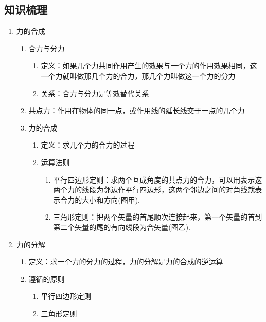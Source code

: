 \documentclass[cn,11pt]{elegantbook}
\begin{document}
      \subsection{知识梳理}
      \begin{enumerate}
         \item 力的合成
         \begin{enumerate}
            \item 合力与分力
            \begin{enumerate}
               \item 定义：如果几个力共同作用产生的效果与一个力的作用效果相同，这一个力就叫做那几个力的合力，那几个力叫做这一个力的分力
               \item 关系：合力与分力是等效替代关系
               
            \end{enumerate}
            \item 共点力：作用在物体的同一点，或作用线的延长线交于一点的几个力
            \item 力的合成
            \begin{enumerate}
               \item 定义：求几个力的合力的过程
               \item 运算法则
               \begin{enumerate}
                  \item 平行四边形定则：求两个互成角度的共点力的合力，可以用表示这两个力的线段为邻边作平行四边形，这两个邻边之间的对角线就表示合力的大小和方向(图甲).
                  \item 三角形定则：把两个矢量的首尾顺次连接起来，第一个矢量的首到第二个矢量的尾的有向线段为合矢量(图乙).
                  
               \end{enumerate}
               
            \end{enumerate}
            
         \end{enumerate}
         \item 力的分解
         \begin{enumerate}
            \item 定义：求一个力的分力的过程，力的分解是力的合成的逆运算
            \item 遵循的原则
            \begin{enumerate}
               \item 平行四边形定则
               \item 三角形定则
               

\end{enumerate}
\end{enumerate}
\end{enumerate}
\end{document}
